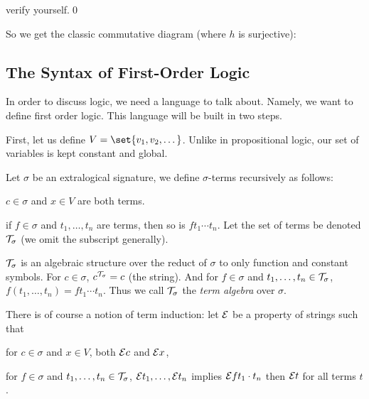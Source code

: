 \ethrm

\Proof verify yourself.\qed

So we get the classic commutative diagram (where $h$ is surjective):

\bigskip
\centerline{
\def\diagrowbuf{1cm}
\def\diagcolbuf{1cm}
}
\bigskip

\subsection{The Syntax of First-Order Logic}

In order to discuss logic, we need a language to talk about.
Namely, we want to define first order logic.
This language will be built in two steps.

First, let us define $V=\set{v_1,v_2,\dots}$.
Unlike in propositional logic, our set of variables is kept constant and global.

\bdefn

    Let $\sigma$ be an extralogical signature, we define $\sigma$-terms recursively
    as follows:
    \benum
        \item $c\in\sigma$ and $x\in V$ are both terms.
        \item if $f\in\sigma$ and $t_1,\dots,t_n$ are terms, then so is $ft_1\cdots t_n$.
    \eenum
    Let the set of terms be denoted ${\cal T}_\sigma$ (we omit the subscript generally).

\edefn

${\cal T}_\sigma$ is an algebraic structure over the reduct of $\sigma$ to only function and
constant symbols.
For $c\in\sigma$, $c^{{\cal T}_\sigma}=c$ (the string).
And for $f\in\sigma$ and $t_1,\dots,t_n\in{\cal T}_\sigma$, $f(t_1,\dots,t_n)=ft_1\cdots t_n$.
Thus we call ${\cal T}_\sigma$ the {\it term algebra} over $\sigma$.

There is of course a notion of term induction: let ${\cal E}$ be a property of strings such that
\benum
    \item for $c\in\sigma$ and $x\in V$, both ${\cal E}c$ and ${\cal E}x$,
    \item for $f\in\sigma$ and $t_1,\dots,t_n\in{\cal T}_\sigma$, ${\cal E}t_1,\dots,{\cal E}t_n$ implies
            ${\cal E}ft_1\cdot t_n$
\eenum
then ${\cal E}t$ for all terms $t$.


